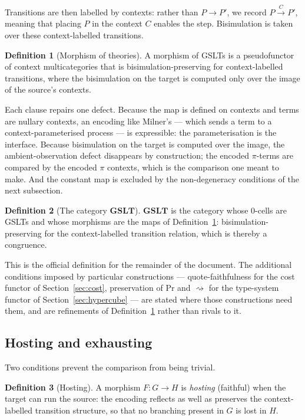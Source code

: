 \documentclass[11pt]{article}
\theoremstyle{definition}
\newtheorem{definition}{Definition}[section]
\theoremstyle{plain}
\theoremstyle{remark}
\newcommand{\GSLT}{\mathbf{GSLT}}
\renewcommand{\Pr}{\mathrm{Pr}}
\newcommand{\rsq}{\rightsquigarrow}
\begin{document}
Transitions are then labelled by contexts: rather than $P \to P'$, we record
$P \xrightarrow{\;C\;} P'$, meaning that placing $P$ in the context $C$ enables the step.
Bisimulation is taken over these context-labelled transitions.

\begin{definition}[Morphism of theories]
\label{def:morphism}
A morphism of GSLTs is a pseudofunctor of context multicategories that is
bisimulation-preserving for context-labelled transitions, where the bisimulation on the
target is computed only over the image of the source's contexts.
\end{definition}

Each clause repairs one defect. Because the map is defined on contexts and terms are
nullary contexts, an encoding like Milner's --- which sends a term to a
context-parameterised process --- is expressible: the parameterisation is the interface.
Because bisimulation on the target is computed over the image, the ambient-observation
defect disappears by construction; the encoded $\pi$-terms are compared by the encoded
$\pi$ contexts, which is the comparison one meant to make. And the constant map is
excluded by the non-degeneracy conditions of the next subsection.

\begin{definition}[The category $\GSLT$]
\label{def:GSLTcat}
$\GSLT$ is the category whose $0$-cells are GSLTs and whose morphisms are the maps of
Definition~\ref{def:morphism}: bisimulation-preserving for the context-labelled
transition relation, which is thereby a congruence.
\end{definition}

This is the official definition for the remainder of the document. The additional
conditions imposed by particular constructions --- quote-faithfulness for the cost
functor of Section~\ref{sec:cost}, preservation of $\Pr$ and $\rsq$ for the type-system
functor of Section~\ref{sec:hypercube} --- are stated where those constructions need
them, and are refinements of Definition~\ref{def:morphism} rather than rivals to it.

\subsection{Hosting and exhausting}

Two conditions prevent the comparison from being trivial.

\begin{definition}[Hosting]
A morphism $F : G \to H$ is \emph{hosting} (faithful) when the target can run the
source: the encoding reflects as well as preserves the context-labelled transition
structure, so that no branching present in $G$ is lost in $H$.
\end{definition}
\end{document}
